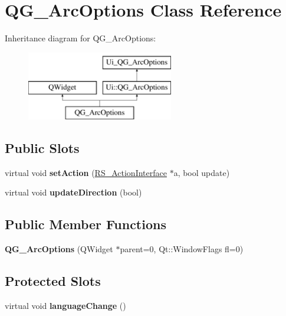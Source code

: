 \hypertarget{classQG__ArcOptions}{\section{Q\-G\-\_\-\-Arc\-Options Class Reference}
\label{classQG__ArcOptions}
}
Inheritance diagram for Q\-G\-\_\-\-Arc\-Options\-:\begin{figure}[H]
\begin{center}
\leavevmode
\includegraphics[height=3.000000cm]{classQG__ArcOptions}
\end{center}
\end{figure}
\subsection*{Public Slots}
\begin{DoxyCompactItemize}
\item 
\hypertarget{classQG__ArcOptions_a81f71a885f48e96768d9e3534e2cc716}{virtual void {\bfseries set\-Action} (\hyperlink{classRS__ActionInterface}{R\-S\-\_\-\-Action\-Interface} $\ast$a, bool update)}\label{classQG__ArcOptions_a81f71a885f48e96768d9e3534e2cc716}

\item 
\hypertarget{classQG__ArcOptions_ab859c1b1f2eb77ad954e78c8ac006765}{virtual void {\bfseries update\-Direction} (bool)}\label{classQG__ArcOptions_ab859c1b1f2eb77ad954e78c8ac006765}

\end{DoxyCompactItemize}
\subsection*{Public Member Functions}
\begin{DoxyCompactItemize}
\item 
\hypertarget{classQG__ArcOptions_a9ed93a52e1543c822832b656ace034a9}{{\bfseries Q\-G\-\_\-\-Arc\-Options} (Q\-Widget $\ast$parent=0, Qt\-::\-Window\-Flags fl=0)}\label{classQG__ArcOptions_a9ed93a52e1543c822832b656ace034a9}

\end{DoxyCompactItemize}
\subsection*{Protected Slots}
\begin{DoxyCompactItemize}
\item 
\hypertarget{classQG__ArcOptions_a600341a24dd955ec16e267d0fb9b896a}{virtual void {\bfseries language\-Change} ()}\label{classQG__ArcOptions_a600341a24dd955ec16e267d0fb9b896a}

\end{DoxyCompactItemize}

